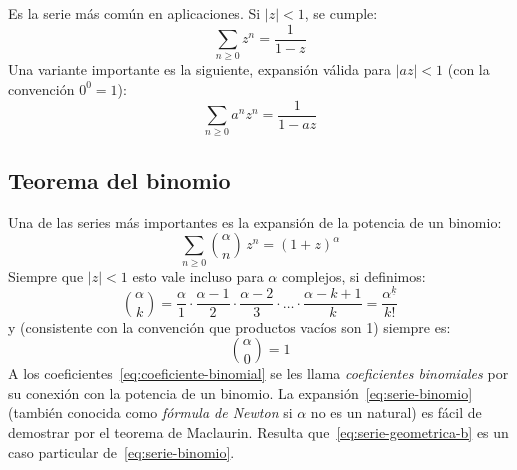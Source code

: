   Es la serie más común en aplicaciones.
  Si \(\lvert z \rvert < 1\),
  se cumple:
  \begin{equation}
    \label{eq:serie-geometrica-b}
    \sum_{n \ge 0} z^n
      = \frac{1}{1 - z}
  \end{equation}
  Una variante importante es la siguiente,
  expansión válida para \(\lvert a z \rvert < 1\)
  (con la convención \(0^0 = 1\)):
  \begin{equation}
    \label{eq:serie-geometrica-c}
    \sum_{n \ge 0} a^n z^n
      = \frac{1}{1 - a z}
  \end{equation}

\subsection{Teorema del binomio}
\label{sec:teorema-binomio}

  Una de las series más importantes
  es la expansión de la potencia de un binomio:
  \begin{equation}
    \label{eq:serie-binomio}
    \sum_{n \ge 0} \binom{\alpha}{n} \, z^n
       = (1 + z)^\alpha
  \end{equation}
  Siempre que \(\lvert z \rvert < 1\)
  esto vale incluso para \(\alpha\) complejos,
  si definimos:
  \begin{equation}
    \label{eq:coeficiente-binomial}
    \binom{\alpha}{k}
       = \frac{\alpha}{1} \cdot \frac{\alpha - 1}{2}
            \cdot \frac{\alpha - 2}{3}
            \cdot \dots
            \cdot \frac{\alpha - k + 1}{k}
       = \frac{\alpha^{\underline{k}}}{k!}
  \end{equation}
  y (consistente con la convención que productos vacíos son \num{1})
  siempre es:
  \begin{equation}
    \label{eq:binomial(alpha,0)}
    \binom{\alpha}{0}
      = 1
  \end{equation}
  A los coeficientes~\eqref{eq:coeficiente-binomial}
  se les llama \emph{coeficientes binomiales}
  por su conexión con la potencia de un binomio.
  La expansión~\eqref{eq:serie-binomio}
  (también conocida como \emph{fórmula de Newton}
   si \(\alpha\) no es un natural)
  es fácil de demostrar por el teorema de Maclaurin.
  Resulta que~\eqref{eq:serie-geometrica-b} es
  un caso particular de~\eqref{eq:serie-binomio}.

